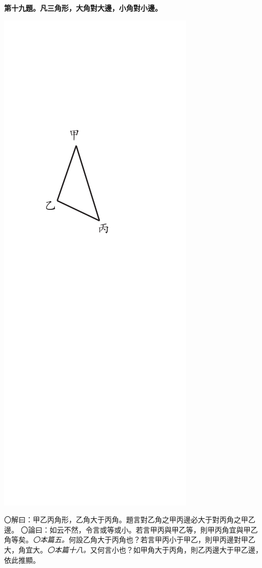 \documentclass[12pt,b5paper,landscape]{article}
\newcommand{\ccom}[1]{{\footnotesize \emph{〇#1}}}
\newcommand{\bcom}[1]{〇#1}
\newcommand{\cthm}[1]{{
\vspace{8pt}

\bfseries #1}}
\begin{document}
\begin{multicols}{2}
\cthm{第十九題。凡三角形，大角對大邊，小角對小邊。}
\begin{center}
    \includegraphics[angle=90]{eu64}  
\end{center}
\bcom{解曰：甲乙丙角形，乙角大于丙角。題言對乙角之甲丙邊必大于對丙角之甲乙邊。}
\bcom{論曰：如云不然，令言或等或小。若言甲丙與甲乙等，則甲丙角宜與甲乙角等矣。\ccom{本篇五。}何設乙角大于丙角也？若言甲丙小于甲乙，則甲丙邊對甲乙大，角宜大。\ccom{本篇十八。}又何言小也？如甲角大于丙角，則乙丙邊大于甲乙邊，依此推顯。}


\end{multicols}
\end{document}
